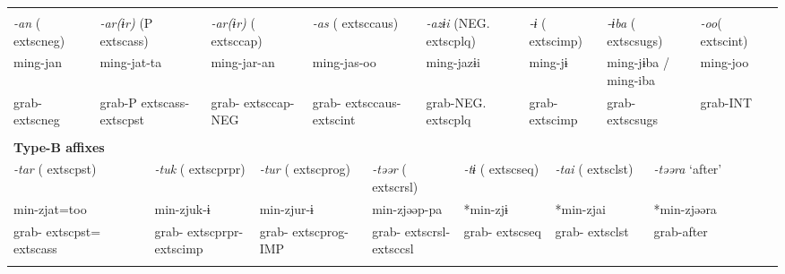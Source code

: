 \tabletail{}
\tablelasttail{}
\begin{tabularx}{\textwidth}{XXXXXXXXXXXXXXXXXXXXXXX}
\lsptoprule
\multicolumn{23}{X}{{\bfseries Type-A affixes}}\\
{ \textit{{}-an} (	extsc{neg})} & \multicolumn{4}{X}{{ \textit{{}-ar(ɨr)} (P	extsc{ass})}} & \multicolumn{4}{X}{{ \textit{{}-ar(ɨr)} (	extsc{cap})}} & \multicolumn{4}{X}{{ \textit{{}-as} (	extsc{caus})}} & \multicolumn{3}{X}{{ \textit{{}-azɨi} (NEG.	extsc{plq})}} & \multicolumn{3}{X}{{ \textit{{}-ɨ} (	extsc{imp})}} & \multicolumn{2}{X}{{ \textit{{}-ɨba} (	extsc{sugs})}} & { \textit{{}-oo}(	extsc{int})} & \\
{ ming-jan} & \multicolumn{4}{X}{{ ming-jat-ta}} & \multicolumn{4}{X}{{ ming-jar-an}} & \multicolumn{4}{X}{{ ming-jas-oo}} & \multicolumn{3}{X}{{ ming-jazɨi}} & \multicolumn{3}{X}{{ ming-jɨ}} & \multicolumn{2}{X}{{ ming-jɨba / ming-iba}} & { ming-joo} & \\
grab-	extsc{neg} & \multicolumn{4}{X}{grab-P	extsc{ass}-	extsc{pst}} & \multicolumn{4}{X}{grab-	extsc{cap}-NEG} & \multicolumn{4}{X}{grab-	extsc{caus}-	extsc{int}} & \multicolumn{3}{X}{grab-NEG.	extsc{plq}} & \multicolumn{3}{X}{grab-	extsc{imp}} & \multicolumn{2}{X}{grab-	extsc{sugs}} & grab-INT & \\
\multicolumn{23}{X}{}\\
\multicolumn{23}{X}{{\bfseries Type-B affixes}}\\
\multicolumn{3}{X}{{ \textit{{}-tar} (	extsc{pst})}} & \multicolumn{5}{X}{{ \textit{{}-tuk} (	extsc{prpr})}} & \multicolumn{2}{X}{{ \textit{{}-tur} (	extsc{prog})}} & \multicolumn{4}{X}{{ \textit{{}-təər} (	extsc{rsl})}} & \multicolumn{3}{X}{{ \textit{{}-tɨ} (	extsc{seq})}} & \multicolumn{3}{X}{{ \textit{{}-tai} (	extsc{lst})}} & \multicolumn{3}{X}{{ \textit{{}-təəra} ‘after’}}\\
\multicolumn{3}{X}{{ min-zjat=too}} & \multicolumn{5}{X}{{ min-zjuk-ɨ}} & \multicolumn{2}{X}{{ min-zjur-ɨ}} & \multicolumn{4}{X}{{ min-zjəəp-pa}} & \multicolumn{3}{X}{{ *min-zjɨ}} & \multicolumn{3}{X}{{ *min-zjai}} & \multicolumn{3}{X}{{ *min-zjəəra}}\\
\multicolumn{3}{X}{grab-	extsc{pst}=	extsc{ass}} & \multicolumn{5}{X}{grab-	extsc{prpr}-	extsc{imp}} & \multicolumn{2}{X}{grab-	extsc{prog}-IMP} & \multicolumn{4}{X}{grab-	extsc{rsl}-	extsc{csl}} & \multicolumn{3}{X}{grab-	extsc{seq}} & \multicolumn{3}{X}{grab-	extsc{lst}} & \multicolumn{3}{X}{{ grab-after}}\\
\multicolumn{3}{X}{} & \multicolumn{5}{X}{} & \multicolumn{2}{X}{} & \multicolumn{4}{X}{} & \multicolumn{3}{X}{} & \multicolumn{3}{X}{} & \multicolumn{3}{X}{}\\

\end{tabularx}
